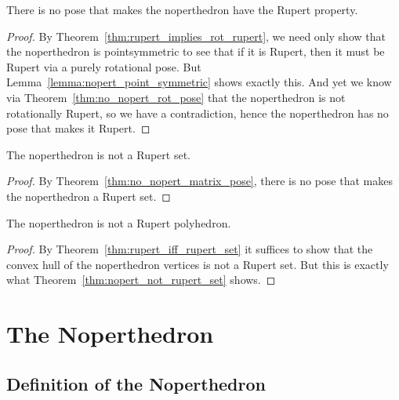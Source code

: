 \begin{theorem}
\label{thm:no_nopert_matrix_pose}
\leanok
There is no pose that makes the noperthedron have the Rupert property.
\end{theorem}
\begin{proof}
\leanok
By Theorem~\ref{thm:rupert_implies_rot_rupert}, we need only show that the noperthedron
is pointsymmetric to see that if it is Rupert, then it must be Rupert via a purely rotational pose.
But Lemma~\ref{lemma:nopert_point_symmetric} shows exactly this. And yet we know via
Theorem~\ref{thm:no_nopert_rot_pose} that the noperthedron is not rotationally Rupert, so we have
a contradiction, hence the noperthedron has no pose that makes it Rupert.
\end{proof}


\begin{theorem}
\label{thm:nopert_not_rupert_set}
\leanok
The noperthedron is not a Rupert set.
\end{theorem}
\begin{proof}
\leanok
By Theorem~\ref{thm:no_nopert_matrix_pose}, there is no pose that makes the noperthedron a Rupert set.
\end{proof}

\begin{theorem}
\label{thm:nopert_not_rupert}
\leanok
The noperthedron is not a Rupert polyhedron.
\end{theorem}

\begin{proof}
\leanok
{}
By Theorem~\ref{thm:rupert_iff_rupert_set} it suffices to show that the convex hull of
the noperthedron vertices is not a Rupert set. But this is exactly what Theorem~\ref{thm:nopert_not_rupert_set} shows.
\end{proof}


\chapter{The Noperthedron}

\section{Definition of the Noperthedron}

